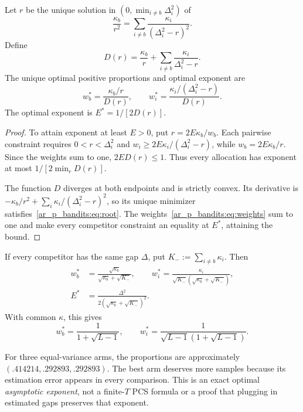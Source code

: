 \begin{theorem}
Let $r$ be the unique solution in $(0,\min_{i\ne b}\Delta_i^2)$ of
\begin{equation}
\boxed{\frac{\kappa_b}{r^2}
=\sum_{i\ne b}\frac{\kappa_i}{(\Delta_i^2-r)^2}.}
\label{ar_p_bandits:eq:root}
\end{equation}
Define
\begin{equation}
D(r)=\frac{\kappa_b}{r}+\sum_{i\ne b}\frac{\kappa_i}{\Delta_i^2-r}.
\end{equation}
The unique optimal positive proportions and optimal exponent are
\begin{equation}
\boxed{w_b^*=\frac{\kappa_b/r}{D(r)},\qquad
w_i^*=\frac{\kappa_i/(\Delta_i^2-r)}{D(r)}.}
\label{ar_p_bandits:eq:weights}
\end{equation}
The optimal exponent is $E^*=1/[2D(r)]$.
\end{theorem}
\begin{proof}
To attain exponent at least $E>0$, put $r=2E\kappa_b/w_b$. Each pairwise constraint requires $0<r<\Delta_i^2$ and
$w_i\geq2E\kappa_i/(\Delta_i^2-r)$, while $w_b=2E\kappa_b/r$. Since the weights sum to one, $2E D(r)\leq1$. Thus every allocation has exponent at most $1/[2\min_r D(r)]$.

The function $D$ diverges at both endpoints and is strictly convex. Its derivative is $-\kappa_b/r^2+\sum_i\kappa_i/(\Delta_i^2-r)^2$, so its unique minimizer satisfies~\eqref{ar_p_bandits:eq:root}. The weights~\eqref{ar_p_bandits:eq:weights} sum to one and make every competitor constraint an equality at $E^*$, attaining the bound.
\end{proof}

\begin{corollary}
If every competitor has the same gap $\Delta$, put $K_-:=\sum_{i\ne b}\kappa_i$. Then
\begin{align}
w_b^*&=\frac{\sqrt{\kappa_b}}{\sqrt{\kappa_b}+\sqrt{K_-}},\qquad
w_i^*=\frac{\kappa_i}{\sqrt{K_-}(\sqrt{\kappa_b}+\sqrt{K_-})},\\
E^*&=\frac{\Delta^2}{2(\sqrt{\kappa_b}+\sqrt{K_-})^2}.
\end{align}
With common $\kappa$, this gives
\begin{equation}
\boxed{w_b^*=\frac1{1+\sqrt{L-1}},\qquad
w_i^*=\frac1{\sqrt{L-1}(1+\sqrt{L-1})}.}
\end{equation}
\end{corollary}
For three equal-variance arms, the proportions are approximately $(.414214,.292893,.292893)$. The best arm deserves more samples because its estimation error appears in every comparison. This is an exact optimal \emph{asymptotic exponent}, not a finite-$T$ PCS formula or a proof that plugging in estimated gaps preserves that exponent.

